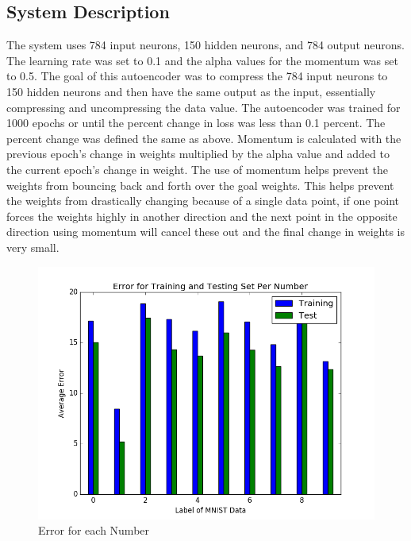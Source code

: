 \documentclass[12pt, letterpaper, twoside]{article}
\begin{document}
\subsection{System Description}
The system uses 784 input neurons, 150 hidden neurons, and 784 output neurons. The learning
rate was set to 0.1 and the alpha values for the momentum was set to 0.5. The goal of this 
autoencoder was to compress the 784 input neurons to 150 hidden neurons and then have the 
same output as the input, essentially compressing and uncompressing the data value. 
The autoencoder was trained for 1000 epochs or until the percent change in loss was less 
than 0.1 percent. The percent change was defined the same as above. Momentum is calculated 
with the previous epoch's change in weights multiplied by the alpha value and added to the 
current epoch's change in weight. The use of momentum helps prevent the weights from bouncing
back and forth over the goal weights. This helps prevent the weights from drastically changing
because of a single data point, if one point forces the weights highly in another direction
and the next point in the opposite direction using momentum will cancel these out and the final
change in weights is very small. 


\begin{figure}
    \centering
    \includegraphics[scale=0.6]{AutoEncoderError.png}
    \caption{Error for each Number}
\end{figure}
\end{document}
